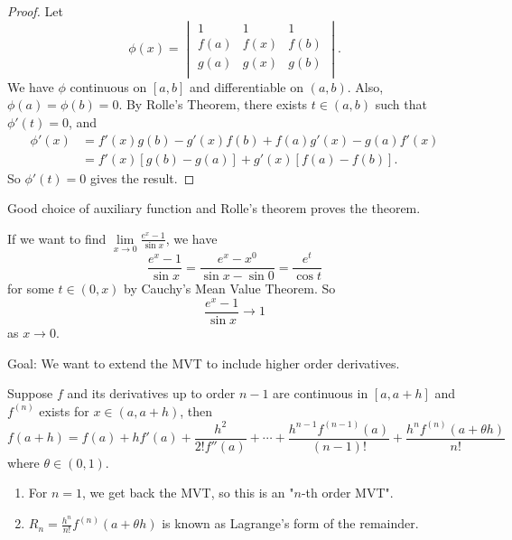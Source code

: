 \begin{proof}
    Let
    \[
        \phi(x) = \begin{vmatrix}
            1 & 1 &  1 \\
            f(a) & f(x) &  f(b) \\
            g(a) & g(x) &  g(b) \\
        \end{vmatrix}.
    \]
    We have \(\phi\) continuous on \([a,b]\) and differentiable on \((a,b)\). Also, \(\phi(a) = \phi(b) = 0\). By Rolle's Theorem, there exists \(t \in (a,b)\) such that \(\phi'(t) = 0\), and
    \begin{align*}
        \phi'(x) &= f'(x)g(b) - g'(x)f(b)+f(a)g'(x)-g(a)f'(x)\\
        &= f'(x)[g(b) - g(a)] + g'(x)[f(a) - f(b)].
    \end{align*}
    So \(\phi'(t) = 0\) gives the result.
\end{proof}
\begin{note}
Good choice of auxiliary function and Rolle's theorem proves the theorem.
\end{note}
\begin{example}
    If we want to find \(\lim\limits_{x \to 0} \frac{e^{x}-1}{\sin x}\), we have
    \[
        \frac{e^x - 1}{\sin x} = \frac{e^x - x^0}{\sin x - \sin 0}= \frac{e^t}{\cos t}
    \]
    for some \(t \in (0,x)\) by Cauchy's Mean Value Theorem. So
    \[
        \frac{e^x - 1}{\sin x} \to 1
    \]
    as \(x \to 0\).
\end{example}
Goal: We want to extend the MVT to include higher order derivatives.
\begin{theorem}
    Suppose \(f\) and its derivatives up to order \(n - 1\) are continuous in \([a, a + h]\) and \(f^{(n)}\) exists for \(x \in (a, a + h)\), then
    \[
        f(a + h) = f(a) + hf'(a) + \frac{h^2}{2!f''(a)} + \cdots + \frac{h^{n-1}f^{(n-1)}(a)}{(n-1)!} + \frac{h^n f^{(n)}(a + \theta h)}{n!}
    \]
    where \(\theta \in (0,1)\).
\end{theorem}
\begin{note}
    \leavevmode
    \begin{enumerate}
        \item For \(n = 1\), we get back the MVT, so this is an "\(n\)-th order MVT".
        \item \(R_n = \frac{h^n}{n!}f^{(n)}(a + \theta h)\) is known as Lagrange's form of the remainder.
    \end{enumerate}
\end{note}
